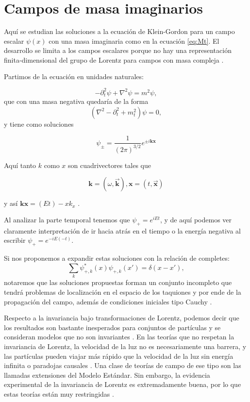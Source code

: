 \documentclass[twocolumn,preprintnumbers,amsmath,amssymb]{revtex4}
\begin{document}
\section{Campos de masa imaginarios}

Aquí se estudian las soluciones a la ecuación de Klein-Gordon para un campo escalar $\psi(x)$ con una masa imaginaria como en la ecuación \eqref{eq:Mt}. El desarrollo se limita a los campos escalares porque no hay una representación finita-dimensional del grupo de Lorentz para campos con masa compleja \cite{feinberg1967possibility}.

Partimos de la ecuación en unidades naturales:

\begin{equation}
-\partial _{t}^{2}\psi +\nabla ^{2}\psi =m^{2}\psi,
\label{eq:Klein1}
\end{equation}
que con una masa negativa quedaría de la forma
\begin{equation}
(\nabla^{2} - \partial _{t}^{2} + m_t^{2} ) \psi = 0,
\label{eq:Klein2}
\end{equation}
y tiene como soluciones 

\begin{equation}
\psi_{\pm} = \frac{1}{ (2 \pi)^{3/2} } e^{\pm i \mathbf{k} \mathbf{x}}
\label{eq:KleinSolutions}
\end{equation}

Aquí tanto $k$ como $x$ son cuadrivectores tales que

\begin{equation}
\mathbf{k} = \left(\omega, \vec{\mathbf{k}} \right) , \mathbf{x} = \left(t, \vec{\mathbf{x}} \right)
\label{eq:WK}
\end{equation}

y así $ \mathbf{k} \mathbf{x} = ( E t ) - x k_x $ .

Al analizar la parte temporal tenemos que $\psi_{+} = e^{iEt}$, y de aquí podemos ver claramente interpretación de ir hacia atrás en el tiempo o la energía negativa al escribir $\psi_{+} = e^{-iE(-t)}$.

Si nos proponemos a expandir estas soluciones con la relación de completes: $$\sum_k \psi_{+,k}^{*}(x) \psi_{+,k}(x') = \delta(x -x'), $$ notaremos que las soluciones propuestas forman un conjunto incompleto que tendrá problemas de localización en el espacio de los taquiones y por ende de la propagación del campo, además de condiciones iniciales tipo Cauchy \cite{feinberg1967possibility}.

Respecto a la invariancia bajo transformaciones de Lorentz, podemos decir que los resultados son bastante inesperados para conjuntos de partículas y se consideran modelos que no son invariantes \cite{feinberg1978lorentz}. En las teorías que no respetan la invariancia de Lorentz, la velocidad de la luz no es necesariamente una barrera, y las partículas pueden viajar más rápido que la velocidad de la luz sin energía infinita o paradojas causales \cite{barcelo2010impossibility}. Una clase de teorías de campo de ese tipo son las llamadas extensiones del Modelo Estándar. Sin embargo, la evidencia experimental de la invariancia de Lorentz es extremadamente buena, por lo que estas teorías están muy restringidas \cite{coleman1999high}.
\end{document}

